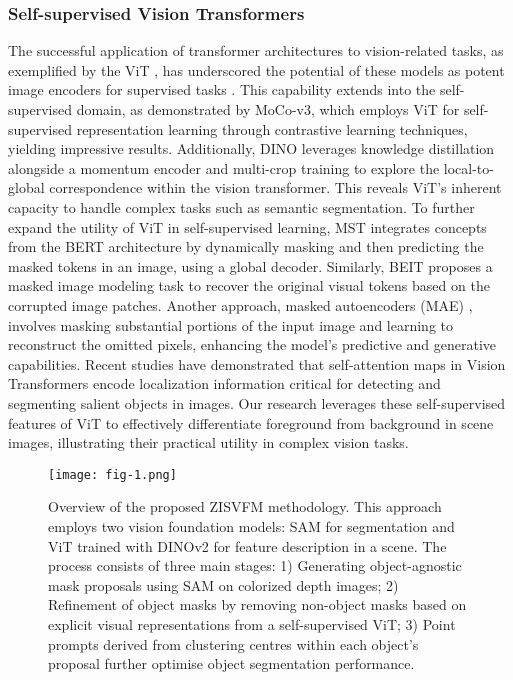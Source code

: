 \subsubsection{Self-supervised Vision Transformers}
The successful application of transformer architectures \cite{vaswani2017attention} to vision-related tasks, as exemplified by the ViT \cite{dosovitskiy2020image}, has underscored the potential of these models as potent image encoders for supervised tasks \cite{zhang2023cross}. This capability extends into the self-supervised domain, as demonstrated by MoCo-v3\cite{chen2021mocov3}, which employs ViT for self-supervised representation learning through contrastive learning techniques, yielding impressive results.
Additionally, DINO \cite{caron2021emerging} leverages knowledge distillation alongside a momentum encoder and multi-crop training to explore the local-to-global correspondence within the vision transformer. This reveals ViT's inherent capacity to handle complex tasks such as semantic segmentation.
To further expand the utility of ViT in self-supervised learning, MST \cite{li2021mst} integrates concepts from the BERT architecture \cite{devlin2018bert} by dynamically masking and then predicting the masked tokens in an image, using a global decoder. Similarly, BEIT \cite{bao2021beit}  proposes a masked image modeling task to recover the original visual tokens based on the corrupted image patches. Another approach, masked autoencoders (MAE) \cite{he2022masked}, involves masking substantial portions of the input image and learning to reconstruct the omitted pixels, enhancing the model's predictive and generative capabilities.
Recent studies \cite{amir2021deep,caron2021emerging,oquab2023dinov2} have demonstrated that self-attention maps in Vision Transformers encode localization information critical for detecting and segmenting salient objects in images. Our research leverages these self-supervised features of ViT to effectively differentiate foreground from background in scene images, illustrating their practical utility in complex vision tasks.
\begin{figure*}
	\centering
	\texttt{[image: fig-1.png]}
	\centering
	\caption{Overview of the proposed ZISVFM methodology. This approach employs two vision foundation models: SAM \cite{kirillov2023segment} for segmentation and ViT trained with DINOv2 \cite{oquab2023dinov2} for feature description in a scene. The process consists of three main stages: 1) Generating object-agnostic mask proposals using SAM on colorized depth images; 2) Refinement of object masks by removing non-object masks based on  explicit visual representations from a self-supervised ViT; 3) Point prompts derived from clustering centres within each object's proposal further optimise object segmentation performance.}
	\label{fig1}
\end{figure*}